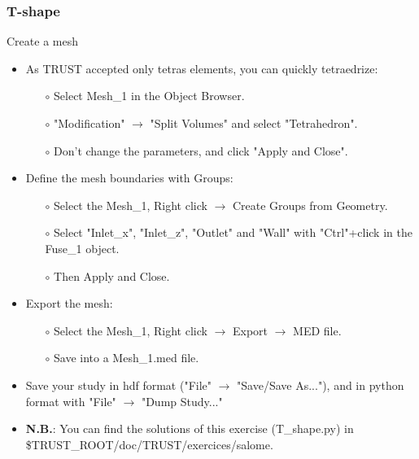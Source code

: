 \documentclass[10pt, hyperref={unicode=true,pdfusetitle, bookmarks=true,bookmarksnumbered=false,bookmarksopen=false, breaklinks=false,pdfborder={0 0 1},backref=true,colorlinks=true,linkcolor=darkblue,pageanchor}]{beamer}
\begin{document}
\begin{frame}
\frametitle{T-shape}
\begin{block}{Create a mesh}

\begin{itemize}
\item As TRUST accepted only tetras elements, you can quickly tetraedrize:
    \begin{itemize}
    \item [$\circ$] Select Mesh\_1 in the Object Browser.
    \item [$\circ$] "Modification" $\rightarrow$ "Split Volumes" and select "Tetrahedron".
    \item [$\circ$] Don't change the parameters, and click "Apply and Close".
    \end{itemize}

\item Define the mesh boundaries with Groups:
    \begin{itemize}
    \item [$\circ$] Select the Mesh\_1, Right click $\rightarrow$ Create Groups from Geometry.
    \item [$\circ$] Select "Inlet\_x", "Inlet\_z", "Outlet" and "Wall" with "Ctrl"+click in the Fuse\_1 object.
    \item [$\circ$] Then Apply and Close.
    \end{itemize}

\item Export the mesh:
    \begin{itemize}
    \item [$\circ$] Select the Mesh\_1, Right click $\rightarrow$ Export $\rightarrow$ MED file.
    \item [$\circ$] Save into a Mesh\_1.med file.
    \end{itemize}

\item Save your study in hdf format ("File" $\rightarrow$ "Save/Save As..."), and in python format with "File" $\rightarrow$ "Dump Study..."

\item \textbf{N.B.}: You can find the solutions of this exercise (T\_shape.py) in \$TRUST\_ROOT/doc/TRUST/exercices/salome.
\end{itemize}

\end{block}
\end{frame}
\end{document}

